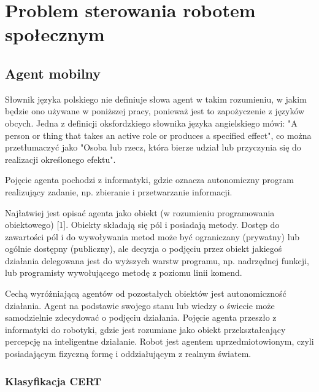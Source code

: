 \chapter{Problem sterowania robotem społecznym}

\section{Agent mobilny}
Słownik języka polskiego nie definiuje słowa agent w takim rozumieniu, w jakim będzie ono używane w poniższej pracy, ponieważ jest to zapożyczenie z języków obcych. Jedna z definicji oksfordzkiego słownika języka angielskiego mówi: "A person or thing that takes an active role or produces a specified effect", co można przetłumaczyć jako "Osoba lub rzecz, która bierze udział lub przyczynia się do realizacji określonego efektu". 

Pojęcie agenta pochodzi z informatyki, gdzie oznacza autonomiczny program realizujący zadanie, np. zbieranie i przetwarzanie informacji.

Najłatwiej jest opisać agenta jako obiekt (w rozumieniu programowania obiektowego) [1]. Obiekty składają się pól i posiadają metody. Dostęp do zawartości pól i do wywoływania metod może być ograniczany (prywatny) lub ogólnie dostępny (publiczny), ale decyzja o podjęciu przez obiekt jakiegoś działania delegowana jest do wyższych warstw programu, np. nadrzędnej funkcji, lub programisty wywołującego metodę z poziomu linii komend. 

Cechą wyróżniającą agentów od pozostałych obiektów jest autonomiczność działania. Agent na podstawie swojego stanu lub wiedzy o świecie może samodzielnie zdecydować o podjęciu działania. Pojęcie agenta przeszło z informatyki do robotyki, gdzie jest rozumiane jako obiekt przekształcający percepcję na inteligentne działanie. Robot jest agentem uprzedmiotowionym, czyli posiadającym fizyczną formę i oddziałującym z realnym światem.

\subsection{Klasyfikacja CERT}


